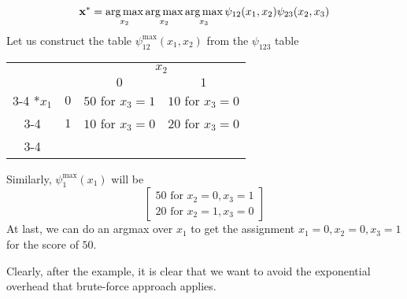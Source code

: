 \begin{exmp}
\[\mathbf{x^*} = \operatorname*{arg\,max}_{x_2} \operatorname*{arg\,max}_{x_2}\operatorname*{arg\,max}_{x_3} \psi_{12}(x_1,x_2)\psi_{23}(x_2,x_3) \]
Let us construct the table $\psi_{12}^{\max} (x_1, x_2)$ from the $\psi_{123}$ table
\begin{center}
	\begin{tabular}{cc|c|c|}
		& \multicolumn{1}{c}{} & \multicolumn{2}{c}{$x_2$}\\
		& \multicolumn{1}{c}{} & \multicolumn{1}{c}{$0$}  & \multicolumn{1}{c}{$1$} \\\cline{3-4}
		\multirow{2}*{$x_1$}  & $0$ & $50$ for $x_3=1$ & $10$ for $x_3=0$ \\\cline{3-4}
		& $1$ & $10$ for $x_3=0$ & $20$ for $x_3=0$ \\\cline{3-4}
	\end{tabular}
\end{center}
Similarly, $\psi_1^{\max} (x_1)$ will be
\[
\begin{bmatrix}
	50 \text{ for $x_2=0, x_3=1$} \\ 20 \text{ for $x_2=1, x_3=0$} 
\end{bmatrix}
\]
At last, we can do an argmax over $x_1$ to get the assignment $x_1=0, x_2=0,x_3=1$ for the score of $50$.
\end{exmp}
Clearly, after the example, it is clear that we want to avoid the exponential overhead that brute-force approach applies.
